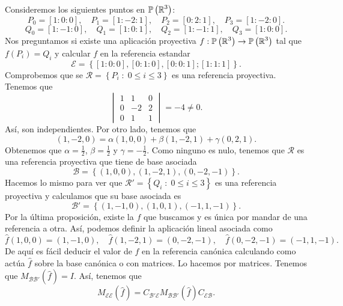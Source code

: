 \begin{eg}
Consideremos los siguientes puntos en $\displaystyle \mathbb{P}\left(\mathbb{R}^{3}\right) $:
\[P_{0}= [1:0:0], \quad P_{1} = [1:-2:1], \quad P_{2} = [0:2:1], \quad P_{3} = [1:-2:0] .\]
\[Q_{0} = [1:-1:0], \quad Q_{1} = [1 : 0: 1], \quad Q_{2} = [1:-1:1], \quad Q_{3} = [1:0:0] .\]
Nos preguntamos si existe una aplicación proyectiva $\displaystyle f : \mathbb{P}\left(\mathbb{R}^{3}\right) \to \mathbb{P}\left(\mathbb{R}^{3}\right) $ tal que $\displaystyle f\left(P_{i}\right) = Q_{i} $ y calcular $\displaystyle f $ en la referencia estandar
\[\mathcal{E} = \left\{ [1:0:0], [0:1:0], [0:0:1]; [1:1:1]\right\}  .\]
Comprobemos que se $\displaystyle \mathcal{R} = \left\{ P_{i} \; :\; 0 \leq i \leq 3\right\}  $ es una referencia proyectiva. Tenemos que 
\[\begin{vmatrix} 1 & 1 & 0 \\ 0 & - 2 & 2 \\ 0 & 1 & 1 \end{vmatrix}  = - 4 \neq 0 .\]
Así, son independientes. Por otro lado, tenemos que 
\[\left(1,-2,0\right) = \alpha\left(1,0,0\right)+\beta\left(1,-2,1\right)+\gamma\left(0,2,1\right) .\]
Obtenemos que $\displaystyle \alpha = \frac{1}{2} $, $\displaystyle \beta = \frac{1}{2} $ y $\displaystyle \gamma = -\frac{1}{2} $. Como ninguno es nulo, tenemos que $\displaystyle \mathcal{R} $ es una referencia proyectiva que tiene de base asociada 
\[\mathcal{B} = \left\{ \left(1,0,0\right), \left(1, -2,1\right), \left(0,-2,-1\right)\right\}  .\]
Hacemos lo mismo para ver que $\displaystyle \mathcal{R}' = \left\{ Q_{i} \; : \; 0 \leq i \leq 3\right\}  $ es una referencia proyectiva y calculamos que su base asociada es
\[\mathcal{B}' = \left\{ \left(1,-1,0\right), \left(1,0,1\right), \left(-1,1,-1\right)\right\}  .\]
Por la última proposición, existe la $\displaystyle f $ que buscamos y es única por mandar de una referencia a otra. Así, podemos definir la aplicación lineal asociada como 
\[\hat{f}\left(1,0,0\right) = \left(1,-1,0\right), \quad \hat{f}\left(1,-2,1\right) = \left(0,-2,-1\right), \quad \hat{f}\left(0,-2,-1\right) = \left(-1,1,-1\right) .\]
De aquí es fácil deducir el valor de $\displaystyle \hat{f} $ en la referencia canónica calculando como actúa $\displaystyle \hat{f} $ sobre la base canónica o con matrices. Lo hacemos por matrices. Tenemos que $\displaystyle M_{\mathcal{B}\mathcal{B}'}\left(\hat{f}\right) = I $. Así, tenemos que 
\[M_{\mathcal{E}\mathcal{E}}\left(\hat{f}\right) = C_{\mathcal{B}'\mathcal{E}} M_{\mathcal{B}\mathcal{B}'}\left(\hat{f}\right)C_{\mathcal{E}\mathcal{B}}.\]

\end{eg}
